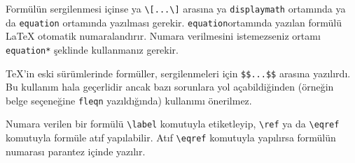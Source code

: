 \documentclass[
  letterpaper,
  DIV=11,
  numbers=noendperiod]{scrreprt}
\newenvironment{Shaded}{\begin{snugshade}}{\end{snugshade}}
\newcommand{\BuiltInTok}[1]{\textcolor[rgb]{0.00,0.23,0.31}{#1}}
\newcommand{\ExtensionTok}[1]{\textcolor[rgb]{0.00,0.23,0.31}{#1}}
\newcommand{\KeywordTok}[1]{\textcolor[rgb]{0.00,0.23,0.31}{#1}}
\newcommand{\NormalTok}[1]{\textcolor[rgb]{0.00,0.23,0.31}{#1}}
\newcommand{\SpecialCharTok}[1]{\textcolor[rgb]{0.37,0.37,0.37}{#1}}
\newcommand{\SpecialStringTok}[1]{\textcolor[rgb]{0.13,0.47,0.30}{#1}}
\begin{document}
Formülün sergilenmesi içinse ya
\texttt{\textbackslash{}{[}...\textbackslash{}{]}} arasına ya
\texttt{displaymath} ortamında ya da \texttt{equation} ortamında
yazılması gerekir. \texttt{equation}ortamında yazılan formülü {\LaTeX}
otomatik numaralandırır. Numara verilmesini istemezseniz ortamı
\texttt{equation*} şeklinde kullanmanız gerekir.

\begin{tcolorbox}[enhanced jigsaw, opacitybacktitle=0.6, coltitle=black, leftrule=.75mm, rightrule=.15mm, toprule=.15mm, bottomtitle=1mm, titlerule=0mm, colbacktitle=quarto-callout-note-color!10!white, breakable, arc=.35mm, opacityback=0, colframe=quarto-callout-note-color-frame, toptitle=1mm, title=\textcolor{quarto-callout-note-color}{\faInfo}\hspace{0.5em}{Not}, bottomrule=.15mm, left=2mm, colback=white]
{\TeX}'in eski sürümlerinde formüller, sergilenmeleri için
\texttt{\$\$...\$\$} arasına yazılırdı. Bu kullanım hala geçerlidir
ancak bazı sorunlara yol açabildiğinden (örneğin belge seçeneğine
\texttt{fleqn} yazıldığında) kullanımı önerilmez.
\end{tcolorbox}

\begin{Shaded}
\end{Shaded}

Numara verilen bir formülü \texttt{\textbackslash{}label} komutuyla
etiketleyip, \texttt{\textbackslash{}ref} ya da
\texttt{\textbackslash{}eqref} komutuyla formüle atıf yapılabilir. Atıf
\texttt{\textbackslash{}eqref} komutuyla yapılırsa formülün numarası
parantez içinde yazılır.
\end{document}
